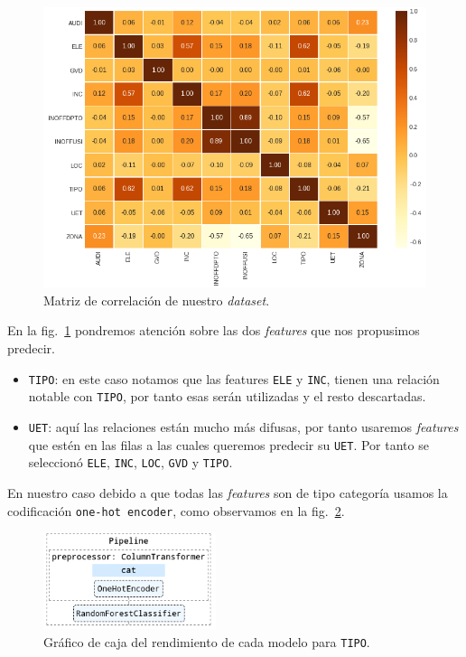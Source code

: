 \documentclass[a4paper,12pt]{article}
\begin{document}
\begin{figure}[H]
	\begin{center}
	\includegraphics[width=1\textwidth]{corrmatrix.png}
  	\caption{Matriz de correlación de nuestro \textit{dataset}.}
  	\label{fig:corrmatrix}
  	\end{center}
\end{figure}

En la fig.~\ref{fig:corrmatrix} pondremos atención sobre las dos \textit{features} que nos propusimos predecir.

\begin{itemize}[noitemsep, topsep=2pt]
	\item \texttt{TIPO}: en este caso notamos que las features \texttt{ELE} y \texttt{INC}, tienen una relación notable con \texttt{TIPO}, por tanto esas serán utilizadas y el resto descartadas.
	\item \texttt{UET}: aquí las relaciones están mucho más difusas, por tanto usaremos \textit{features} que estén en las filas a las cuales queremos predecir su \texttt{UET}. Por tanto se seleccionó \texttt{ELE}, \texttt{INC}, \texttt{LOC}, \texttt{GVD} y \texttt{TIPO}.
\end{itemize}

En nuestro caso debido a que todas las \textit{features} son de tipo categoría usamos la codificación \texttt{one-hot encoder}, como observamos en la fig.~\ref{fig:sklearn}.

\begin{figure}[H]
	\begin{center}
	\includegraphics[width=0.45\textwidth]{tesis_74.png}
  	\caption{Gráfico de caja del rendimiento de cada modelo para \texttt{TIPO}.}
  	\label{fig:sklearn}
  	\end{center}
\end{figure}
\end{document}
